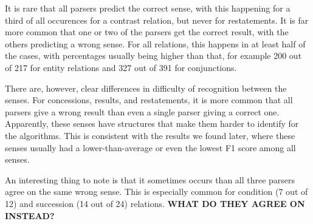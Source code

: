 \documentclass[10pt,notitlepage]{scrartcl}
\begin{document}
It is rare that all parsers predict the correct sense, with this happening for a third of all occurences for a contrast relation, but never for restatements. It is far more common that one or two of the parsers get the correct result, with the others predicting a wrong sense. For all relations, this happens in at least half of the cases, with percentages usually being higher than that, for example 200 out of 217 for entity relations and 327 out of 391 for conjunctions.

There are, however, clear differences in difficulty of recognition between the senses. For concessions, results, and restatements, it is more common that all parsers give a wrong result than even a single parser giving a correct one. Apparently, these senses have structures that make them harder to identify for the algorithms. This is consistent with the results we found later, where these senses usually had a lower-than-average or even the lowest F1 score among all senses.

An interesting thing to note is that it sometimes occurs than all three parsers agree on the same wrong sense. This is especially common for condition (7 out of 12) and succession (14 out of 24) relations. \textbf{WHAT DO THEY AGREE ON INSTEAD?}

\begin{table}[htbp]
\centering
{}
\caption{Sense agreement (implicit and explicit) between oslopots, ecnucs and steven}
\label{tab:comp1}
\end{table}
\end{document}
